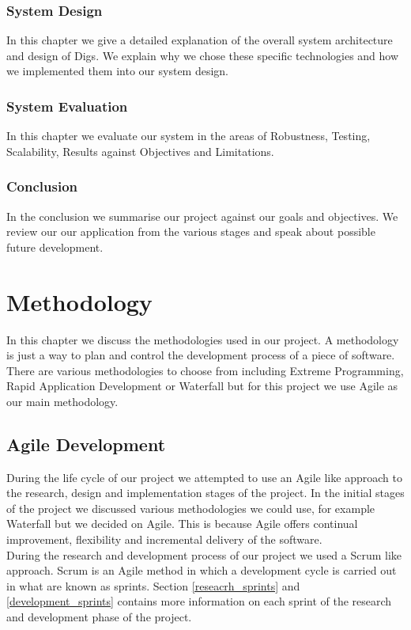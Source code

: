 \subsection{System Design}
In this chapter we give a detailed explanation of the overall system
architecture and design of Digs. We explain why we chose these specific technologies and how we implemented them into our system design.


\subsection{System Evaluation}
In this chapter we evaluate our system in the areas of Robustness, Testing, Scalability, Results against Objectives and Limitations.


\subsection{Conclusion}
In the conclusion we summarise our project against our goals and objectives. We review our our application from the various stages and speak about possible future development.



\chapter{Methodology}
In this chapter we discuss the methodologies used in our project. A methodology is just a way to plan and control the development process of a piece of software. There are various methodologies to choose from including Extreme Programming, Rapid Application Development or Waterfall but for this project we use Agile as our main methodology.

\section{Agile Development}
During the life cycle of our project we attempted to use an Agile like approach to the research, design and implementation stages of the project. In the initial stages of the project we discussed various methodologies we could use, for example Waterfall but we decided on Agile. This is because Agile offers continual improvement, flexibility and incremental delivery of the software.  \\

\noindent During the research and development process of our project we used a Scrum like approach. Scrum is an Agile method in which a development cycle is carried out in what are known as sprints. Section \ref{reseacrh_sprints} and \ref{development_sprints} contains more information on each sprint of the research and development phase of the project. \\

